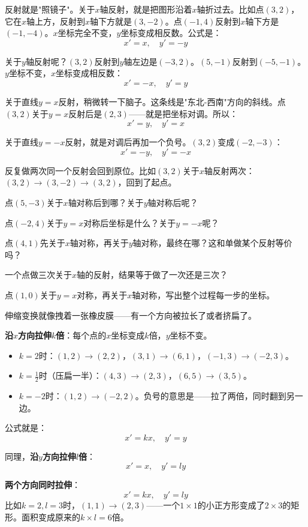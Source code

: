 \documentclass[a4paper,12pt]{ctexart}
\begin{document}

反射就是"照镜子"。关于$x$轴反射，就是把图形沿着$x$轴折过去。比如点$(3,2)$，它在$x$轴上方，反射到$x$轴下方就是$(3,-2)$。点$(-1,4)$反射到$x$轴下方是$(-1,-4)$。$x$坐标完全不变，$y$坐标变成相反数。公式是：
\[
x'=x,\quad y'=-y
\]

关于$y$轴反射呢？$(3,2)$反射到$y$轴左边是$(-3,2)$。$(5,-1)$反射到$(-5,-1)$。$y$坐标不变，$x$坐标变成相反数：
\[
x'=-x,\quad y'=y
\]

关于直线$y=x$反射，稍微转一下脑子。这条线是"东北-西南"方向的斜线。点$(3,2)$关于$y=x$反射后是$(2,3)$——就是把坐标对调。所以：
\[
x'=y,\quad y'=x
\]

关于直线$y=-x$反射，就是对调后再加一个负号。$(3,2)$变成$(-2,-3)$：
\[
x'=-y,\quad y'=-x
\]

反复做两次同一个反射会回到原位。比如$(3,2)$关于$x$轴反射两次：$(3,2)\to(3,-2)\to(3,2)$，回到了起点。

\begin{exercise}[反射练习]
\item 点$(5,-3)$关于$x$轴对称后到哪？关于$y$轴对称后呢？
\item 点$(-2,4)$关于$y=x$对称后坐标是什么？关于$y=-x$呢？
\item 点$(4,1)$先关于$x$轴对称，再关于$y$轴对称，最终在哪？这和单做某个反射等价吗？
\item 一个点做三次关于$x$轴的反射，结果等于做了一次还是三次？
\item 点$(1,0)$关于$y=x$对称，再关于$x$轴对称，写出整个过程每一步的坐标。
\end{exercise}



伸缩变换就像拽着一张橡皮膜——有一个方向被拉长了或者挤扁了。

\textbf{沿$x$方向拉伸$k$倍}：每个点的$x$坐标变成$k$倍，$y$坐标不变。
\begin{itemize}
\item $k=2$时：$(1,2)\to(2,2)$，$(3,1)\to(6,1)$，$(-1,3)\to(-2,3)$。
\item $k=\frac12$时（压扁一半）：$(4,3)\to(2,3)$，$(6,5)\to(3,5)$。
\item $k=-2$时：$(1,2)\to(-2,2)$。负号的意思是——拉了两倍，同时翻到另一边。
\end{itemize}
公式就是：
\[
x'=kx,\quad y'=y
\]

同理，\textbf{沿$y$方向拉伸$l$倍}：
\[
x'=x,\quad y'=ly
\]

\textbf{两个方向同时拉伸}：
\[
x'=kx,\quad y'=ly
\]
比如$k=2,l=3$时，$(1,1)\to(2,3)$——一个$1\times1$的小正方形变成了$2\times3$的矩形。面积变成原来的$k\times l=6$倍。
\end{document}
